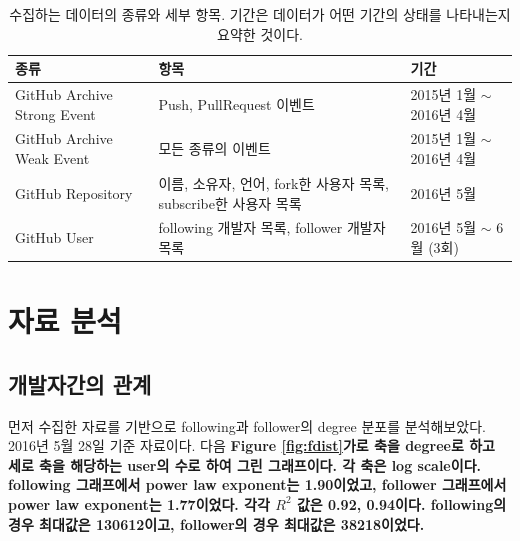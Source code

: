 \documentclass[10pt, a4paper, titlepage]{article}
\begin{document}
\begin{table}[ht]
\begin{tabular}{|m{2.5cm}|m{4cm}|m{4.0cm}|}

\hline

종류 & 항목 & 기간 \\

\hline

GitHub Archive Strong Event &
Push, PullRequest 이벤트 &
2015년 1월 $\sim$ 2016년 4월 \\

\hline

GitHub Archive Weak Event &
모든 종류의 이벤트&
2015년 1월 $\sim$ 2016년 4월 \\

\hline

GitHub Repository &
이름, 소유자, 언어, fork한 사용자 목록, subscribe한 사용자 목록 &
2016년 5월 \\

\hline

GitHub User &
following 개발자 목록,
follower 개발자 목록 &
2016년 5월 $\sim$ 6월 (3회)\\

\hline
\end{tabular} 

\caption{
	수집하는 데이터의 종류와 세부 항목. 기간은 데이터가 어떤 기간의 상태를 나타내는지 요약한 것이다.
}
\label{tab:collect}
\end{table}


\section{자료 분석}
\subsection{개발자간의 관계}
먼저 수집한 자료를 기반으로 following과 follower의 degree 분포를 분석해보았다. 2016년 5월 28일 기준 자료이다. 다음 \bf{Figure} \ref{fig:fdist} 가로 축을 degree로 하고 세로 축을 해당하는 user의 수로 하여 그린 그래프이다. 각 축은 log scale이다. following 그래프에서 power law exponent는 1.90이었고, follower 그래프에서 power law exponent는 1.77이었다. 각각 $R^2$ 값은 0.92, 0.94이다. following의 경우 최대값은 130612이고, follower의 경우 최대값은 38218이었다.
\end{document}
